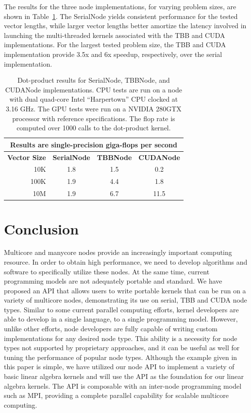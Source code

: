\documentclass[10pt,conference,letterpaper]{IEEEtran}
\begin{document}
The results for the three node implementations, for varying problem sizes, are shown in Table~\ref{tbl:results}. The SerialNode yields consistent performance for the tested vector lengths, while larger vector lengths better amortize the latency involved in launching the multi-threaded kernels associated with the TBB and CUDA implementations. For the largest tested problem size, the TBB and CUDA implementation provide 3.5x and 6x speedup, respectively, over the serial implementation.

\begin{table}[!h]
\centering

\caption{Dot-product results for SerialNode, TBBNode, and CUDANode implementations. 
CPU tests are run on a node with dual quad-core Intel ``Harpertown'' CPU clocked at 3.16 GHz. The GPU tests were run on a NVIDIA 280GTX processor with reference specifications. The flop rate is computed over 1000 calls to the dot-product kernel.}
\label{tbl:results}

\begin{small}
\begin{tabular}{rccc}
\hline
\multicolumn{4}{c}{Results are single-precision giga-flops per second} \\\hline
{\bfseries Vector Size} & {\bfseries SerialNode} & {\bfseries TBBNode} & {\bfseries CUDANode} \\\hline
10K & 1.8 & 1.5 & 0.2 \\\hline
100K & 1.9 & 4.4 & 1.8  \\\hline
10M & 1.9 & 6.7 & 11.5 \\\hline
\end{tabular}
\end{small}

\end{table}

\section{Conclusion}

Multicore and manycore nodes provide an increasingly important computing resource.  In order to obtain high performance, we need to develop algorithms and software to specifically utilize these nodes.  At the same time, current programming models are not adequately portable and standard.  We have proposed an API that allows users to write portable kernels that can be run on a variety of multicore nodes, demonstrating its use on serial, TBB and CUDA node types. Similar to some current parallel computing efforts, kernel developers are able to develop in a single language, to a single programming model. However, unlike other efforts, node developers are fully capable of writing custom implementations for any desired node type. This ability is a necessity for node types not supported by proprietary approaches, and it can be useful as well for tuning the performance of popular node types.  Although the example given in this paper is simple, we have utilized our node API to implement a variety of basic linear algebra kernels and will use the API as the foundation for our linear algebra kernels.  The API is composable with an inter-node programming model such as MPI, providing a complete parallel capability for scalable multicore computing.
\end{document}
